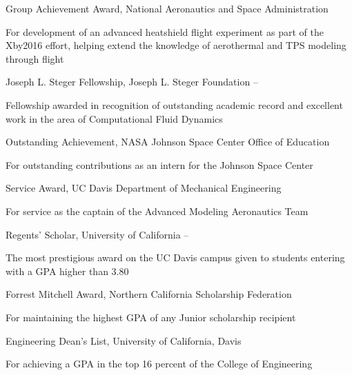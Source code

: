 \documentclass[letterpaper,MMMyyyy,nonstop]{simpleresumecv}
\begin{document}
\begin{body}
\BulletItem
Group Achievement Award,
National Aeronautics and Space Administration
\hfill
\begin{detail}
\SubItem
For development of an advanced heatshield flight experiment as part of the Xby2016 effort, helping extend the knowledge of aerothermal and TPS modeling through flight
\end{detail}

\Gap
\BulletItem
Joseph L. Steger Fellowship,
Joseph L. Steger Foundation
\hfill
 --
\begin{detail}
\SubItem
Fellowship awarded in recognition of outstanding academic record and excellent work in the area of Computational Fluid Dynamics
\end{detail}

\Gap
\BulletItem
Outstanding Achievement,
NASA Johnson Space Center Office of Education
\hfill
\begin{detail}
\SubItem
For outstanding contributions as an intern for the Johnson Space Center
\end{detail}

\Gap
\BulletItem
Service Award,
UC Davis Department of Mechanical Engineering
\hfill
\begin{detail}
\SubItem
For service as the captain of the Advanced Modeling Aeronautics Team
\end{detail}

\Gap
\BulletItem
Regents' Scholar,
University of California
\hfill
{} --
\begin{detail}
\SubItem
The most prestigious award on the UC Davis campus given to students entering with a GPA higher than 3.80
\end{detail}

\Gap
\BulletItem
Forrest Mitchell Award,
Northern California Scholarship Federation
\hfill
{}
\begin{detail}
\SubItem
For maintaining the highest GPA of any Junior scholarship recipient
\end{detail}

\Gap
\BulletItem
Engineering Dean's List,
University of California, Davis
\hfill
{}
\begin{detail}
\SubItem
For achieving a GPA in the top 16 percent of the College of Engineering
\end{detail}


\end{body}
\end{document}

